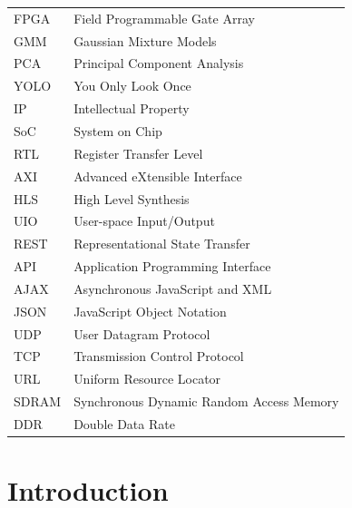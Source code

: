\documentclass[12pt,a4paper]{report}
\begin{document}
\begin{table}[H]
\centering
\begin{tabular}{ll}
FPGA & Field Programmable Gate Array \\
GMM & Gaussian Mixture Models\\
PCA & Principal Component Analysis \\
YOLO                     & You Only Look Once                                \\
IP                       & Intellectual Property                             \\
SoC                      & System on Chip                                    \\
RTL                      & Register Transfer Level                           \\
AXI                      & Advanced eXtensible Interface                      \\
HLS                      & High Level Synthesis                              \\
UIO                      & User-space Input/Output                            \\
REST                     & Representational State Transfer                   \\
API                      & Application Programming Interface                 \\
AJAX                     & Asynchronous JavaScript and XML                   \\
JSON                     & JavaScript Object Notation                        \\
UDP                      & User Datagram Protocol                            \\
TCP                      & Transmission Control Protocol                     \\
URL                      & Uniform Resource Locator                          \\
SDRAM                    & Synchronous Dynamic Random Access Memory          \\
DDR                      & Double Data Rate                                 
\end{tabular}
\end{table}
\newpage
{}
\setcounter{page}{1}

\chapter{\textbf{Introduction}}
\end{document}
